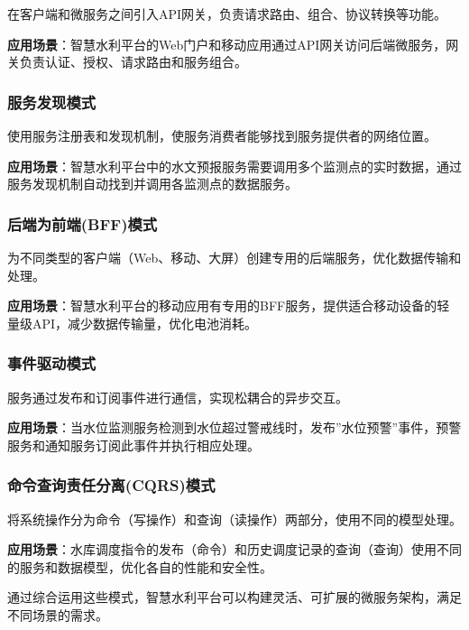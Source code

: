 在客户端和微服务之间引入API网关，负责请求路由、组合、协议转换等功能。

\textbf{应用场景}：智慧水利平台的Web门户和移动应用通过API网关访问后端微服务，网关负责认证、授权、请求路由和服务组合。

\subsubsection{服务发现模式}\label{ux670dux52a1ux53d1ux73b0ux6a21ux5f0f}

使用服务注册表和发现机制，使服务消费者能够找到服务提供者的网络位置。

\textbf{应用场景}：智慧水利平台中的水文预报服务需要调用多个监测点的实时数据，通过服务发现机制自动找到并调用各监测点的数据服务。

\subsubsection{后端为前端(BFF)模式}\label{ux540eux7aefux4e3aux524dux7aefbffux6a21ux5f0f}

为不同类型的客户端（Web、移动、大屏）创建专用的后端服务，优化数据传输和处理。

\textbf{应用场景}：智慧水利平台的移动应用有专用的BFF服务，提供适合移动设备的轻量级API，减少数据传输量，优化电池消耗。

\subsubsection{事件驱动模式}\label{ux4e8bux4ef6ux9a71ux52a8ux6a21ux5f0f}

服务通过发布和订阅事件进行通信，实现松耦合的异步交互。

\textbf{应用场景}：当水位监测服务检测到水位超过警戒线时，发布''水位预警''事件，预警服务和通知服务订阅此事件并执行相应处理。

\subsubsection{命令查询责任分离(CQRS)模式}\label{ux547dux4ee4ux67e5ux8be2ux8d23ux4efbux5206ux79bbcqrsux6a21ux5f0f}

将系统操作分为命令（写操作）和查询（读操作）两部分，使用不同的模型处理。

\textbf{应用场景}：水库调度指令的发布（命令）和历史调度记录的查询（查询）使用不同的服务和数据模型，优化各自的性能和安全性。

通过综合运用这些模式，智慧水利平台可以构建灵活、可扩展的微服务架构，满足不同场景的需求。

